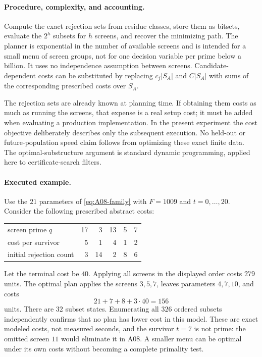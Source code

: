 \documentclass[11pt,a4paper]{article}
\theoremstyle{definition}\newtheorem{definition}[theorem]{Definition}
\theoremstyle{remark}\newtheorem{remark}[theorem]{Remark}
\begin{document}
\paragraph{Procedure, complexity, and accounting.}
Compute the exact rejection sets from residue classes, store them as
bitsets, evaluate the $2^h$ subsets for $h$ screens, and recover the
minimizing path. The planner is exponential in the number of available
screens and is intended for a small menu of screen groups, not for one
decision variable per prime below a billion. It uses no independence
assumption between screens. Candidate-dependent costs can be substituted
by replacing $c_j|S_A|$ and $C|S_A|$ with sums of the corresponding prescribed
costs over $S_A$.

The rejection sets are already known at planning time. If obtaining them
costs as much as running the screens, that expense is a real setup cost;
it must be added when evaluating a production implementation. In the
present experiment the cost objective deliberately describes only the
subsequent execution. No held-out or future-population speed claim follows
from optimizing these exact finite data. The optimal-substructure argument
is standard dynamic programming, applied here to certificate-search filters.

\paragraph{Executed example.}
Use the $21$ parameters of \eqref{eq:A08-family} with $F=1009$ and
$t=0,\ldots,20$. Consider the following prescribed abstract costs:
\begin{center}\small
\begin{tabular}{@{}lrrrrr@{}}
\toprule
screen prime $q$ & 17 & 3 & 13 & 5 & 7\\
cost per survivor & 5 & 1 & 4 & 1 & 2\\
initial rejection count & 3 & 14 & 2 & 8 & 6\\
\bottomrule
\end{tabular}
\end{center}
Let the terminal cost be $40$. Applying all screens in the displayed
order costs $279$ units. The optimal plan applies the screens
$3,5,7$, leaves parameters $4,7,10$, and costs
\[
 21+7+8+3\cdot40=156
\]
units. There are $32$ subset states. Enumerating all $326$ ordered subsets
independently confirms that no plan has lower cost in this model.
These are exact modeled costs, not measured seconds, and the survivor
$t=7$ is not prime: the omitted screen $11$ would eliminate it in A08.
A smaller menu can be optimal under its own costs without becoming a
complete primality test.
\end{document}
